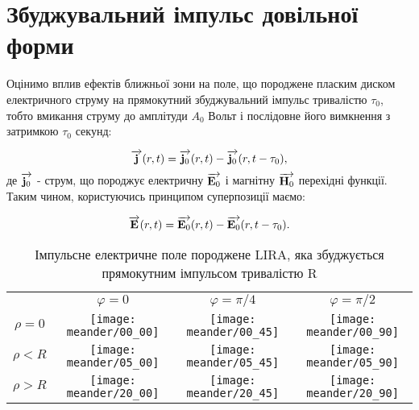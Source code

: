 
\section{Збуджувальний імпульс довільної форми}

Оцінимо вплив ефектів ближньої зони на поле, що породжене пласким диском 
електричного струму на прямокутний збуджувальний імпульс тривалістю 
$ \tau_0 $, тобто вмикання струму до амплітуди $ A_0 $ Вольт і послідовне 
його вимкнення з затримкою $ \tau_0 $ секунд:

\begin{equation}
\overrightarrow{\mathbf j} (r,t) = \overrightarrow{\mathbf j_0} (r,t) - \overrightarrow{\mathbf j_0} (r,t-\tau_0),
\end{equation}
%
де $ \overrightarrow{\mathbf j_0} $ - струм, що породжує електричну $ \overrightarrow{\mathbf E_0} $ і магнітну 
$ \overrightarrow{\mathbf H_0} $ перехідні функції. Таким чином, користуючись принципом 
суперпозиції маємо:

\begin{equation}
\overrightarrow{\mathbf E} (r,t) = \overrightarrow{\mathbf E_0} (r,t) - \overrightarrow{\mathbf E_0} (r,t-\tau_0).
\end{equation}

\begin{table}[ht]
\caption{Імпульсне електричне поле породжене LIRA, яка збуджується 
прямокутним імпульсом тривалістю R} \label{tab:meander_shape}
\centering
\begin{tabular}{cccc}

& $ \varphi = 0 $ & $ \varphi = \pi/4 $ & $ \varphi = \pi/2 $ \\

$ \rho = 0 $ &
\texttt{[image: meander/00\_00]} & 
\texttt{[image: meander/00\_45]} & 
\texttt{[image: meander/00\_90]} \\

$ \rho < R $ &
\texttt{[image: meander/05\_00]} & 
\texttt{[image: meander/05\_45]} & 
\texttt{[image: meander/05\_90]} \\

$ \rho > R $ &
\texttt{[image: meander/20\_00]} & 
\texttt{[image: meander/20\_45]} & 
\texttt{[image: meander/20\_90]} \\

\end{tabular}
\end{table}

